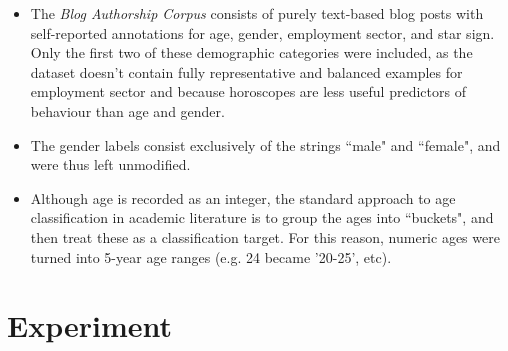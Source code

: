\documentclass{report}
\begin{document}
\begin{itemize}
\item The \textit{Blog Authorship Corpus} consists of purely text-based blog posts with self-reported annotations for age, gender, employment sector, and star sign. Only the first two of these demographic categories were included, as the dataset doesn't contain fully representative and balanced examples for employment sector and because horoscopes are less useful predictors of behaviour than age and gender.

\item The gender labels consist exclusively of the strings ``male" and ``female", and were thus left unmodified.

\item Although age is recorded as an integer, the standard approach to age classification in academic literature  is to group the ages into ``buckets", and then treat these as a classification target. For this reason, numeric ages were turned into 5-year age ranges (e.g. 24 became '20-25', etc).
\end{itemize}

\section{Experiment}
\end{document}
